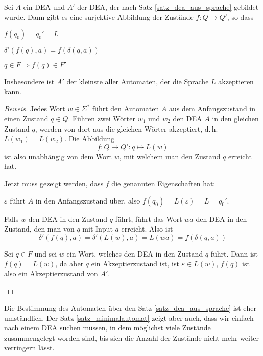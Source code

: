 \begin{satz}[Minimalautomat]\label{satz_minimalautomat}
Sei $A$ ein DEA und $A'$ der DEA, der nach
Satz \ref{satz_dea_aus_sprache} gebildet wurde.
Dann gibt es eine surjektive Abbildung der Zustände $f\colon Q\to Q'$, so dass
\begin{compactenum}
\item $f(q_0)=q_0'=L$
\item $\delta'(f(q),a)=f(\delta(q,a))$
\item $q\in F\Rightarrow f(q)\in F'$
\end{compactenum}
Insbesondere ist $A'$ der kleinste aller Automaten, der die Sprache
$L$ akzeptieren kann.
\end{satz}

\begin{proof}[Beweis]
Jedes Wort $w\in\Sigma^*$ führt den Automaten $A$ aus dem
Anfangszustand in einen Zustand $q\in Q$.
Führen zwei Wörter $w_1$ und $w_2$ den DEA $A$ in den gleichen Zustand $q$,
werden von dort aus die gleichen Wörter akzeptiert, d.\,h.~$L(w_1)=L(w_2)$.
Die Abbildung
\[
f\colon Q\to Q': q\mapsto L(w)
\]
ist also unabhängig von dem Wort $w$, mit welchem man den Zustand $q$
erreicht hat.

Jetzt muss gezeigt werden, dass $f$ die genannten Eigenschaften hat:
\begin{compactenum}
\item
$\varepsilon$ führt $A$ in den Anfangszustand über, also
$f(q_0)=L(\varepsilon)=L=q_0'$.
\item Falls $w$ den DEA in den Zustand $q$ führt, führt das Wort
$wa$ den DEA in den Zustand, den man von $q$ mit Input $a$ erreicht.
Also ist
\[
\delta'(f(q),a)=\delta'(L(w), a)=L(wa)=f(\delta(q,a))
\]
\item Sei $q\in F$ und sei $w$ ein Wort, welches den DEA in den Zustand 
$q$ führt.
Dann ist $f(q)=L(w)$, da aber $q$ ein Akzeptierzustand ist,
ist $\varepsilon\in L(w)$, $f(q)$ ist also ein Akzeptierzustand von
$A'$.
\end{compactenum}

\end{proof}

Die Bestimmung des Automaten über den Satz \ref{satz_dea_aus_sprache}
ist eher umständlich.
Der Satz \ref{satz_minimalautomat} zeigt
aber auch, dass wir einfach nach einem DEA suchen müssen, in dem
möglichst viele Zustände zusammengelegt worden sind, bis sich die
Anzahl der Zustände nicht mehr weiter verringern lässt.

